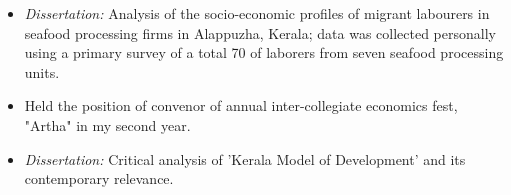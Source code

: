 \documentclass[9pt,a4paper]{altacv}
\begin{document}
\begin{itemize}
    \item \textit{Dissertation:} Analysis of the socio-economic profiles of migrant labourers in seafood processing firms in Alappuzha, Kerala; data was collected personally using a primary survey of a total 70 of laborers from seven seafood processing units.
    \item Held the position of convenor of annual inter-collegiate economics fest, "Artha" in my second year.
\end{itemize}
\divider
{}
\begin{itemize}
    \item \textit{Dissertation:} Critical analysis of ’Kerala Model of Development’ and its contemporary relevance.
\end{itemize}



\end{document}

